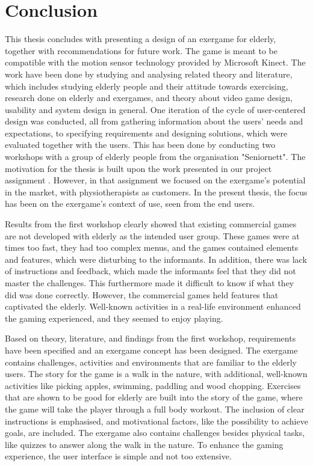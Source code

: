 \chapter{Conclusion}

This thesis concludes with presenting a design of an exergame for elderly, together with recommendations for future work. The game is meant to be compatible with the motion sensor technology provided by Microsoft Kinect. The work have been done by studying and analysing related theory and literature, which includes studying elderly people and their attitude towards exercising, research done on elderly and exergames, and theory about video game design, usability and system design in general. One iteration of the cycle of user-centered design was conducted, all from gathering information about the users' needs and expectations, to specifying requirements and designing solutions, which were evaluated together with the users. This has been done by conducting two workshops with a group of elderly people from the organisation "Seniornett". The motivation for the thesis is built upon the work presented in our project assignment \cite{project}. However, in that assignment we focused on the exergame's potential in the market, with physiotherapists as customers. In the present thesis, the focus has been on the exergame's context of use, seen from the end users. 

Results from the first workshop clearly showed that existing commercial games are not developed with elderly as the intended user group. These games were at times too fast, they had too complex menus, and the games contained elements and features, which were disturbing to the informants. In addition, there was lack of instructions and feedback, which made the informants feel that they did not master the challenges. This furthermore made it difficult to know if what they did was done correctly. However, the commercial games held features that captivated the elderly. Well-known activities in a real-life environment enhanced the gaming experienced, and they seemed to enjoy playing. 

Based on theory, literature, and findings from the first workshop, requirements have been specified and an exergame concept has been designed. The exergame contains challenges, activities and environments that are familiar to the elderly users. The story for the game is a walk in the nature, with additional, well-known activities like picking apples, swimming, paddling and wood chopping. Exercises that are shown to be good for elderly are built into the story of the game, where the game will take the player through a full body workout. The inclusion of clear instructions is emphasised, and motivational factors, like the possibility to achieve goals, are included. The exergame also contains challenges besides physical tasks, like quizzes to answer along the walk in the nature. To enhance the gaming experience, the user interface is simple and not too extensive.

